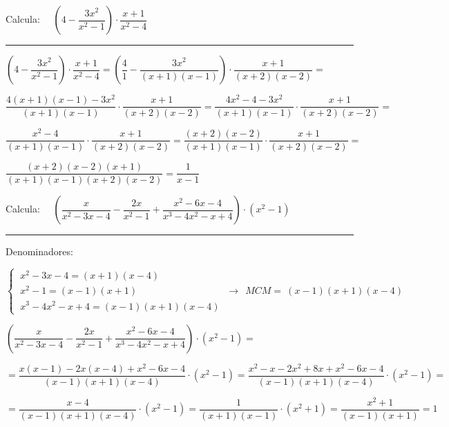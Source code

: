 \begin{miejercicio}

Calcula: $\quad \left( 4-\dfrac{3x^2}{x^2-1}\right) \cdot \dfrac{x+1}{x^2-4}$

\rule{250pt}{0.1pt}

\vspace{2mm} $\left( 4-\dfrac{3x^2}{x^2-1}\right) \cdot \dfrac{x+1}{x^2-4}=
\left( 	\dfrac 4 1-\dfrac{3x^2}{(x+1)(x-1)}\right) \cdot \dfrac{x+1}{(x+2)(x-2)}=$

\vspace{2mm}
$\dfrac{4(x+1)(x-1)-3x^2}{(x+1)(x-1)} \cdot \dfrac{x+1}{(x+2)(x-2)}=
\dfrac{4x^2-4-3x^2}{(x+1)(x-1)} \cdot \dfrac{x+1}{(x+2)(x-2)}=$

\vspace{2mm} 
$\dfrac{x^2-4}{(x+1)(x-1)} \cdot \dfrac{x+1}{(x+2)(x-2)}=
\dfrac{(x+2)(x-2)}{(x+1)(x-1)} \cdot \dfrac{x+1}{(x+2)(x-2)}=$

\vspace{2mm}
$\dfrac{(x+2)(x-2)(x+1)}{(x+1)(x-1)(x+2)(x-2)} = \dfrac {1}{x-1}$
	
\end{miejercicio}


\begin{miejercicio}

Calcula: $\quad \left( \dfrac{x}{x^2-3x-4}-\dfrac{2x}{x^2-1}+\dfrac{x^2-6x-4}{x^3-4x^2-x+4} \right) \cdot (x^2-1)$

\rule{250pt}{0.1pt}

Denominadores: 

\vspace{2mm}$\begin{cases}\  x^2-3x-4=(x+1)(x-4) \\ \ 	x^2-1=(x-1)(x+1)\\ \ x^3-4x^2-x+4=(x-1)(x+1)(x-4) \end{cases} \ \to \ \ MCM=\ (x-1)(x+1)(x-4)$

\vspace{4mm}
 $\left( \dfrac{x}{x^2-3x-4}-\dfrac{2x}{x^2-1}+\dfrac{x^2-6x-4}{x^3-4x^2-x+4} \right) \cdot (x^2-1) = $
 
 \vspace{2mm}\begin{small} $= \dfrac{x(x-1)-2x(x-4)+x^2-6x-4}{(x-1)(x+1)(x-4)}  \cdot (x^2-1)= \dfrac{x^2-x-2x^2+8x+x^2-6x-4}{(x-1)(x+1)(x-4)}\cdot (x^2-1)=$ \end{small}
 
 \vspace{2mm} $= \dfrac{x-4}{(x-1)(x+1)(x-4)}\cdot (x^2-1)=\dfrac{1}{(x+1)(x-1)}\cdot (x^2+1)= \dfrac{x^2+1}{(x-1)(x+1)}= 1$	
\end{miejercicio}



